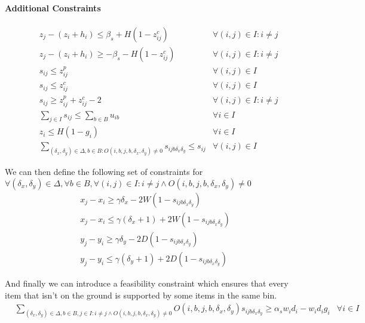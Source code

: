 \paragraph*{Additional Constraints}
\begin{eqnarray}
    & z_j - (z_i + h_i) \le \beta_s + H (1 - z^c_{ij}) & \forall (i, j) \in I : i \neq j \label{cons:z_close_1} \\
    & z_j - (z_i + h_i) \ge -\beta_s - H (1 - z^c_{ij}) & \forall (i, j) \in I : i \neq j \label{cons:z_close_2} \\
    & s_{ij} \le z^p_{ij} & \forall (i, j) \in I  \label{cons:supporting_1} \\
    & s_{ij} \le z^c_{ij} & \forall (i, j) \in I  \label{cons:supporting_2} \\
    & s_{ij} \ge z^p_{ij} + z^c_{ij} - 2 & \forall (i, j) \in I : i \neq j \label{cons:supporting} \\
    & \sum\limits_{j \in I}{s_{ij}} \le \sum\limits_{b \in B}{u_{ib}} & \forall i \in I  \label{cons:support_comes_from_placed} \\
    & z_i \le H(1 - g_i) & \forall i \in I \label{cons:grounded} \\
    & \sum\limits_{(\delta_x, \delta_y) \in \Delta, b \in B : O(i, b, j, b, \delta_x, \delta_y) \neq 0} s_{i j b \delta_x \delta_y } \le s_{ij} & \forall (i, j) \in I \label{cons:discretized_support_same}
\end{eqnarray}

We can then define the following set of constraints for $\forall (\delta_x, \delta_y) \in \Delta, \forall b \in B, \forall (i,j) \in I : i \neq j \land O(i, b, j, b, \delta_x, \delta_y) \neq 0$
\begin{eqnarray}
    & x_j - x_i \ge \gamma \delta_x - 2W( 1 - s_{i j b \delta_x \delta_y}) &  \label{cons:discretized_support_limit_x_1} \\
    & x_j - x_i \le \gamma (\delta_x + 1) + 2W( 1 - s_{i j b \delta_x \delta_y}) &  \label{cons:discretized_support_limit_x_2} \\
    & y_j - y_i \ge \gamma \delta_y - 2D( 1 - s_{i j b \delta_x \delta_y}) &  \label{cons:discretized_support_limit_y_1} \\
    & y_j - y_i \le \gamma (\delta_y + 1) + 2D( 1 - s_{i j b \delta_x \delta_y}) &  \label{cons:discretized_support_limit_y_2}
\end{eqnarray}

And finally we can introduce a feasibility constraint which ensures that every item that isn't on the ground is supported by some items in the same bin.
\begin{eqnarray*}
    & \sum\limits_{(\delta_x, \delta_y) \in \Delta, b \in B, j \in I : i \neq j \land O(i, b, j, b, \delta_x, \delta_y) \neq 0}{ O(i, b, j, b, \delta_x, \delta_y)s_{i j b \delta_x \delta_y }} \ge \alpha_s w_i d_i - w_i d_i g_i & \forall i \in I \label{cons:every_item_is_supported}
\end{eqnarray*}